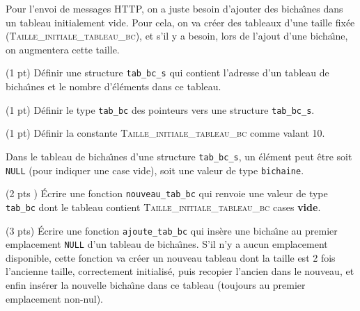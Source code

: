 
Pour l'envoi de messages \textsf{HTTP}, on a juste besoin d'ajouter
des bicha{\^\i}nes dans un tableau initialement vide. Pour cela, on va
cr{\'e}er des tableaux d'une taille fix{\'e}e
(\textsc{Taille\_initiale\_tableau\_bc}), et s'il y a besoin, lors de
l'ajout d'une bicha{\^\i}ne, on augmentera cette taille.

\question (1 pt) D{\'e}finir une structure \texttt{tab\_bc\_s} qui contient
l'adresse d'un tableau de bicha{\^\i}nes et le nombre d'{\'e}l{\'e}ments dans ce
tableau.

\question (1 pt) D{\'e}finir le type \texttt{tab\_bc} des pointeurs vers
une structure \texttt{tab\_bc\_s}.

\question (1 pt) D{\'e}finir la constante
\textsc{Taille\_initiale\_tableau\_bc} comme valant 10.

Dans le tableau de bicha{\^\i}nes d'une structure \texttt{tab\_bc\_s}, un
{\'e}l{\'e}ment peut {\^e}tre soit \texttt{NULL} (pour indiquer une case vide),
soit une valeur de type \texttt{bichaine}.


\question (2 pts ) {\'E}crire une fonction \texttt{nouveau\_tab\_bc} qui
renvoie une valeur de type \texttt{tab\_bc} dont le tableau contient
\textsc{Taille\_initiale\_tableau\_bc} cases \textbf{vide}.

\question (3 pts) {\'E}crire une fonction \texttt{ajoute\_tab\_bc} qui
ins{\`e}re une bicha{\^\i}ne au premier emplacement \texttt{NULL} d'un tableau
de bicha{\^\i}nes. S'il n'y a aucun emplacement disponible, cette fonction
va cr{\'e}er un nouveau tableau dont la taille est 2 fois l'ancienne
taille, correctement initialis{\'e}, puis recopier l'ancien dans le nouveau, et
enfin ins{\'e}rer la nouvelle bicha{\^\i}ne dans ce tableau (toujours au
premier emplacement non-nul).

\vspace*{3em}

